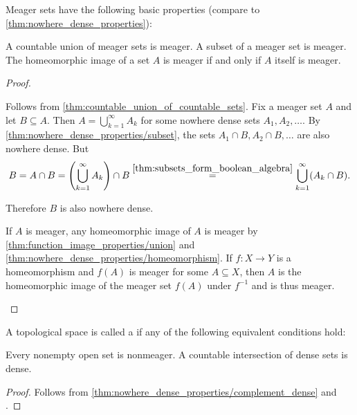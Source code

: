 \begin{proposition}\label{thm:meager_set_properties}\cite[43]{Rudin1991}
  Meager sets have the following basic properties (compare to \cref{thm:nowhere_dense_properties}):
  \begin{propenum}
     A countable union of meager sets is meager.
     A subset of a meager set is meager.
     The homeomorphic image of a set \( A \) is meager if and only if \( A \) itself is meager.
  \end{propenum}
\end{proposition}
\begin{proof}
  \begin{description}
     Follows from \cref{thm:countable_union_of_countable_sets}.
     Fix a meager set \( A \) and let \( B \subseteq A \). Then \( A = \bigcup_{k=1}^\infty A_k \) for some nowhere dense sets \( A_1, A_2, \ldots \). By \cref{thm:nowhere_dense_properties/subset}, the sets \( A_1 \cap B, A_2 \cap B, \ldots \) are also nowhere dense. But
    \begin{equation*}
      B
      =
      A \cap B
      =
      \left(\bigcup_{k=1}^\infty A_k \right) \cap B
      \overset {\ref{thm:subsets_form_boolean_algebra}} =
      \bigcup_{k=1}^\infty (A_k \cap B).
    \end{equation*}

    Therefore \( B \) is also nowhere dense.

    \mbox{}
    \begin{description}
      \ImpliedBy If \( A \) is meager, any homeomorphic image of \( A \) is meager by \cref{thm:function_image_properties/union} and \cref{thm:nowhere_dense_properties/homeomorphism}.
      \Implies If \( f: X \to Y \) is a homeomorphism and \( f(A) \) is meager for some \( A \subseteq X \), then \( A \) is the homeomorphic image of the meager set \( f(A) \) under \( f^{-1} \) and is thus meager.
    \end{description}
  \end{description}
\end{proof}

\begin{definition}\label{def:baire_space}
  A topological space is called a  if any of the following equivalent conditions hold:
  \begin{defenum}
     Every nonempty open set is nonmeager.
     A countable intersection of dense sets is dense.
  \end{defenum}
\end{definition}
\begin{proof}
   Follows from \cref{thm:nowhere_dense_properties/complement_dense} and .
\end{proof}

